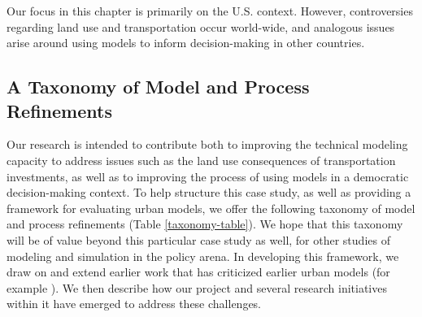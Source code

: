 Our focus in this chapter is primarily on the U.S. context.  However,
controversies regarding land use and transportation occur world-wide, and
analogous issues arise around using models to inform decision-making in
other countries.

\subsection{A Taxonomy of Model and Process Refinements}
\label{sec:refinement-taxonomy}

Our research is intended to contribute both to improving the technical
modeling capacity to address issues such as the land use consequences of
transportation investments, as well as to improving the process of using
models in a democratic decision-making context. To help structure this case
study, as well as providing a framework for evaluating urban models, we
offer the following taxonomy of model and process refinements
(Table \ref{taxonomy-table}).  We hope
that this taxonomy will be of value beyond this particular case study as
well, for other studies of modeling and simulation in the policy arena.  In
developing this framework, we draw on and extend earlier work that has
criticized earlier urban models (for example \cite{lee-1973}).  We then
describe how our project and several research initiatives within it have
emerged to address these challenges.

